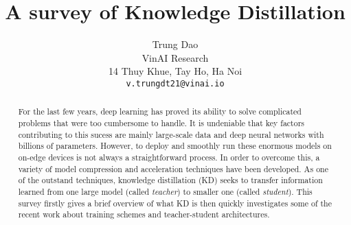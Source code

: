 \documentclass[10pt,twocolumn,letterpaper]{article}
\begin{document}
\title{A survey of Knowledge Distillation}

\author{Trung Dao\\
VinAI Research\\
14 Thuy Khue, Tay Ho, Ha Noi\\
{\tt\small v.trungdt21@vinai.io}
}

\maketitle

\begin{abstract}
   For the last few years, deep learning has proved its ability to solve complicated problems that were too cumbersome to handle. It is undeniable that key factors contributing to this sucess are mainly large-scale data and deep neural networks with billions of parameters. However, to deploy and smoothly run these enormous models on on-edge devices is not always a straightforward process. In order to overcome this, a variety of model compression and acceleration techniques have been developed. As one of the outstand techniques, knowledge distillation (KD) seeks to transfer information learned from one large model (called \textit{teacher}) to smaller one (called \textit{student}). This survey firstly gives a brief overview of what KD is then quickly investigates some of the recent work about training schemes and teacher-student architectures.
\end{abstract}





{\small


}
\end{document}
